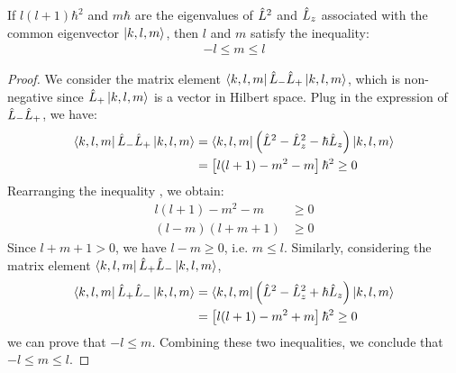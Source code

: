 \begin{lemma} \label{lemma:-l<=m<=l}
    If $l(l+1)\hbar^2$ and $m \hbar$ are the eigenvalues of $\hat{L}^2$ and $\hat{L}_z$ associated with the common eigenvector $\ket{k,l,m}$, then $l$ and $m$ satisfy the inequality: 
    \begin{align}
        -l \leq m \leq l
    \end{align}
\end{lemma}
\begin{proof}
    We consider the matrix element $\bra{k,l,m} \hat{L}_- \hat{L}_+ \ket{k,l,m}$, which is non-negative since $\hat{L}_+ \ket{k,l,m}$ is a vector in Hilbert space. Plug in the expression of $\hat{L}_- \hat{L}_+$, we have:
    \begin{align*}
        \bra{k,l,m} \hat{L}_- \hat{L}_+ \ket{k,l,m} &= \bra{k,l,m} \left( \hat{L}^2 -\hat{L}_z^2 - \hbar \hat{L}_z \right) \ket{k,l,m} \\
        &= \left[ l(l+1) - m^2 - m \right] \hbar^2 \geq 0
    \end{align*}
    Rearranging the inequality , we obtain:
    \begin{align*}
        l(l+1) - m^2 - m &\geq 0\\
        (l - m)(l + m + 1) &\geq 0
    \end{align*}
    Since $l + m + 1 > 0$, we have $l - m \geq 0$, i.e. $m \leq l$. Similarly, considering the matrix element $\bra{k,l,m} \hat{L}_+ \hat{L}_- \ket{k,l,m}$,
    \begin{align}
        \bra{k,l,m} \hat{L}_+ \hat{L}_- \ket{k,l,m} &= \bra{k,l,m} \left( \hat{L}^2 -\hat{L}_z^2 + \hbar \hat{L}_z \right) \ket{k,l,m} \\
        &= \left[ l(l+1) - m^2 + m \right] \hbar^2 \geq 0   \label{eq:l+l-positve}
    \end{align} 
    we can prove that $-l \leq m$. Combining these two inequalities, we conclude that $-l \leq m \leq l$.
\end{proof}

